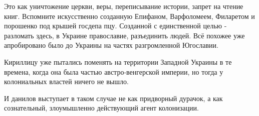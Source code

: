 Это как уничтожение церкви, веры, переписывание истории, запрет на чтение книг.
Вспомните искусственно созданную Епифаном, Варфоломеем, Филаретом и порошенко
под крышей госдепа пцу. Созданной с единственной целью - разломать здесь, в
Украине православие, разъединить людей. Всё похожее уже апробировано было до
Украины на частях разгромленной Югославии. 

Кириллицу уже пытались поменять на территории Западной Украины в те времена,
когда она была частью австро-венгерской империи, но тогда у колониальных
властей ничего не вышло. 

И данилов выступает в таком случае не как придворный дурачок, а как
сознательный, злоумышленно действующий агент колонизации.

